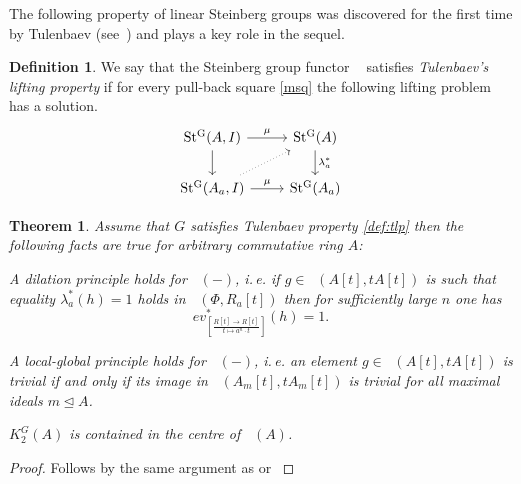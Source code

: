\documentclass[oneside,12pt]{amsart}
\newtheorem{thm}{Theorem}
\numberwithin{equation}{section}
\numberwithin{lem}{section}
\theoremstyle{definition}
\newtheorem{dfn}[lem]{Definition}
\theoremstyle{remark}
\DeclareMathOperator{\St}{St^G}
\newcommand{\eval}[4]{ev_{\scriptstyle \left[\frac{#2[#1] \rightarrow #3}{#1 \mapsto #4}\right]}}
\newcommand{\ev}[3]{\eval{t}{#1}{#2}{#3}}
\begin{document}
The following property of linear Steinberg groups was discovered for the first time by Tulenbaev
(see~\cite[Lemmas 2.3, 3.2]{Tu}) and plays a key role in the sequel.
\begin{dfn} \label{def:tlp}
We say that the Steinberg group functor $\St$ satisfies {\it Tulenbaev's lifting property}
if for every pull-back square \eqref{msq} the following lifting problem has a solution.
\[\begin{tikzcd} \St(A,   I) \arrow[r, "\mu"] \arrow[d]          &  \St(A) \ar[d, "\lambda_a^*"] \\
                 \St(A_a, I) \arrow[r, "\mu"] \arrow[ur, dotted] &  \St(A_a) \end{tikzcd}\]
\end{dfn}

\begin{thm} Assume that $G$ satisfies Tulenbaev property \eqref{def:tlp} then the following facts are true for arbitrary commutative ring $A$:
\begin{thmlist}
 \item \label{thm:dp} A dilation principle holds for $\St(-)$, i.\,e. if $g\in\St(A[t], tA[t])$ is such that equality $\lambda_a^*(h) = 1$ holds in $\St(\Phi, R_a[t])$ then
       for sufficiently large $n$ one has $$\ev{R}{R[t]}{a^n\cdot t}^*(h) = 1.$$
 \item \label{thm:lg-k2} A local-global principle holds for $\St(-)$, i.\,e. an element $g \in \St(A[t], tA[t])$ is trivial if and only if its image in
                         $\St(A_m[t], tA_m[t])$ is trivial for all maximal ideals $m \trianglelefteq A$.
 \item \label{thm:centr} $K_2^G(A)$ is contained in the centre of $\St(A)$.
\end{thmlist}


\end{thm}
\begin{proof} Follows by the same argument as \cite[Theorem~2.1]{Tu} or \cite[Theorem~2]{S15} \end{proof}



\end{document}
